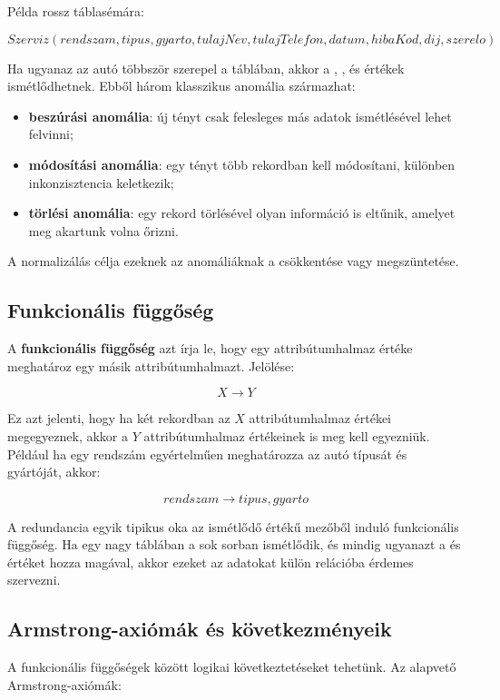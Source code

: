 Példa rossz táblasémára:

\[
  Szerviz(rendszam, tipus, gyarto, tulajNev, tulajTelefon, datum, hibaKod, dij, szerelo)
\]

Ha ugyanaz az autó többször szerepel a táblában, akkor a , ,  és  értékek ismétlődhetnek. Ebből három klasszikus anomália származhat:

\begin{itemize}
  \item \textbf{beszúrási anomália}: új tényt csak felesleges más adatok ismétlésével lehet felvinni;
  \item \textbf{módosítási anomália}: egy tényt több rekordban kell módosítani, különben inkonzisztencia keletkezik;
  \item \textbf{törlési anomália}: egy rekord törlésével olyan információ is eltűnik, amelyet meg akartunk volna őrizni.
\end{itemize}

A normalizálás célja ezeknek az anomáliáknak a csökkentése vagy megszüntetése.

\subsection{Funkcionális függőség}

A \textbf{funkcionális függőség} azt írja le, hogy egy attribútumhalmaz értéke meghatároz egy másik attribútumhalmazt. Jelölése:

\[
  X \to Y
\]

Ez azt jelenti, hogy ha két rekordban az \(X\) attribútumhalmaz értékei megegyeznek, akkor a \(Y\) attribútumhalmaz értékeinek is meg kell egyezniük. Például ha egy rendszám egyértelműen meghatározza az autó típusát és gyártóját, akkor:

\[
  rendszam \to tipus, gyarto
\]

A redundancia egyik tipikus oka az ismétlődő értékű mezőből induló funkcionális függőség. Ha egy nagy táblában a  sok sorban ismétlődik, és mindig ugyanazt a  és  értéket hozza magával, akkor ezeket az adatokat külön relációba érdemes szervezni.

\subsection{Armstrong-axiómák és következményeik}

A funkcionális függőségek között logikai következtetéseket tehetünk. Az alapvető Armstrong-axiómák:


